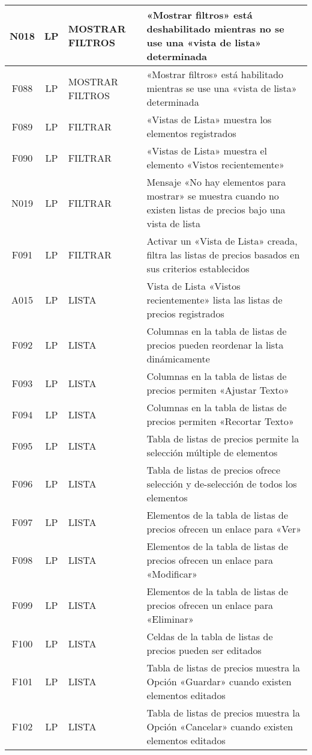 \begin{landscape}
{\begin{longtable}[htb]{|c|c|p{5.0cm}|p{14.0cm}|}
N018 & LP & MOSTRAR FILTROS & «Mostrar filtros» está deshabilitado mientras no se use una «vista de lista» determinada \\ \hline
F088 & LP & MOSTRAR FILTROS & «Mostrar filtros» está habilitado mientras se use una «vista de lista» determinada \\ \hline
F089 & LP & FILTRAR & «Vistas de Lista» muestra los elementos registrados \\ \hline
F090 & LP & FILTRAR & «Vistas de Lista» muestra el elemento «Vistos recientemente» \\ \hline
N019 & LP & FILTRAR & Mensaje «No hay elementos para mostrar» se muestra cuando no existen listas de precios bajo una vista de lista \\ \hline
F091 & LP & FILTRAR & Activar un «Vista de Lista» creada, filtra las listas de precios basados en sus criterios establecidos \\ \hline
A015 & LP & LISTA & Vista de Lista «Vistos recientemente» lista las listas de precios registrados \\ \hline
F092 & LP & LISTA & Columnas en la tabla de listas de precios pueden reordenar la lista dinámicamente \\ \hline
F093 & LP & LISTA & Columnas en la tabla de listas de precios permiten «Ajustar Texto» \\ \hline
F094 & LP & LISTA & Columnas en la tabla de listas de precios permiten «Recortar Texto» \\ \hline
F095 & LP & LISTA & Tabla de listas de precios permite la selección múltiple de elementos \\ \hline
F096 & LP & LISTA & Tabla de listas de precios ofrece selección y de-selección de todos los elementos \\ \hline
F097 & LP & LISTA & Elementos de la tabla de listas de precios ofrecen un enlace para «Ver» \\ \hline
F098 & LP & LISTA & Elementos de la tabla de listas de precios ofrecen un enlace para «Modificar» \\ \hline
F099 & LP & LISTA & Elementos de la tabla de listas de precios ofrecen un enlace para «Eliminar» \\ \hline
F100 & LP & LISTA & Celdas de la tabla de listas de precios pueden ser editados \\ \hline
F101 & LP & LISTA & Tabla de listas de precios muestra la Opción «Guardar» cuando existen elementos editados \\ \hline
F102 & LP & LISTA & Tabla de listas de precios muestra la Opción «Cancelar» cuando existen elementos editados \\ \hline

\end{longtable}}
\end{landscape}
